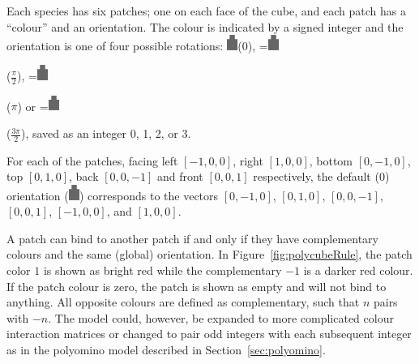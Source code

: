 Each species has six patches; one on each face of the cube, and each patch has a ``colour'' and an orientation. The colour is indicated by a signed integer and the orientation is one of four possible rotations: \includegraphics[width=10pt]{figures/face.eps}\hspace{4pt}(\(0\)),
\begingroup{}=\hbox{\includegraphics[width=10pt,angle=-90]{figures/face.eps}}\parbox{\wd0}{}\endgroup\hspace{4pt}(\(\frac{\pi}{2}\)),
\begingroup{}=\hbox{\includegraphics[width=10pt,angle=180]{figures/face.eps}}\parbox{\wd0}{}\endgroup\hspace{4pt}(\(\pi\)) or
\begingroup{}=\hbox{\includegraphics[width=10pt,angle=90]{figures/face.eps}}\parbox{\wd0}{}\endgroup\hspace{4pt}(\(\frac{3\pi}{2}\)), saved as an integer 0, 1, 2, or 3.

For each of the patches, facing left \(\left[-1, 0, 0\right]\), right \(\left[1, 0, 0\right]\), bottom \(\left[0, -1, 0\right]\), top \(\left[0, 1, 0\right]\), back \(\left[0, 0, -1\right]\) and front \(\left[0, 0, 1\right]\) respectively, the default (\(0\)) orientation (\includegraphics[width=10pt]{figures/face.eps}) corresponds to the vectors \(\left[0, -1, 0\right]\), \(\left[0, 1, 0\right]\), \(\left[0, 0, -1\right]\), \(\left[0, 0, 1\right]\), \(\left[-1, 0, 0\right]\), and \(\left[1, 0, 0\right]\).

A patch can bind to another patch if and only if they have complementary colours and the same (global) orientation. In Figure~\ref{fig:polycubeRule}, the patch color \(1\) is shown as bright red while the complementary \(-1\) is a darker red colour. If the patch colour is zero, the patch is shown as empty and will not bind to anything. All opposite colours are defined as complementary, such that \(n\) pairs with \(-n\). The model could, however, be expanded to more complicated colour interaction matrices or changed to pair odd integers with each subsequent integer as in the polyomino model \cite{ahnert2010self,johnston2011evolutionary} described in Section~\ref{sec:polyomino}.

